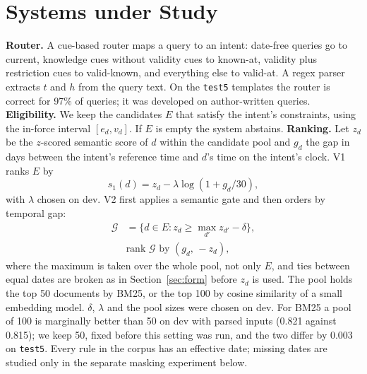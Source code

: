 \documentclass[11pt]{article}
\begin{document}
\section{Systems under Study}\label{sec:method}

\textbf{Router.} A cue-based router maps a query to an intent: date-free queries go to current, knowledge cues without validity cues to known-at, validity plus restriction cues to valid-known, and everything else to valid-at. A regex parser extracts $t$ and $h$ from the query text. On the \texttt{test5} templates the router is correct for 97\% of queries; it was developed on author-written queries. \textbf{Eligibility.} We keep the candidates $E$ that satisfy the intent's constraints, using the in-force interval $[e_d, v_d]$. If $E$ is empty the system abstains. \textbf{Ranking.} Let $z_d$ be the $z$-scored semantic score of $d$ within the candidate pool and $g_d$ the gap in days between the intent's reference time and $d$'s time on the intent's clock. V1 ranks $E$ by
\begin{equation}\label{eq:v1}
s_1(d) = z_d - \lambda \log\!\left(1 + g_d/30\right),
\end{equation}
with $\lambda$ chosen on dev. V2 first applies a semantic gate and then orders by temporal gap:
\begin{equation}\label{eq:v2}
\begin{split}
\mathcal{G} &= \{d \in E : z_d \ge \max_{d'} z_{d'} - \delta\},\\
&\text{rank } \mathcal{G} \text{ by } (g_d,\,-z_d),
\end{split}
\end{equation}
where the maximum is taken over the whole pool, not only $E$, and ties between equal dates are broken as in Section~\ref{sec:form} before $z_d$ is used. The pool holds the top 50 documents by BM25, or the top 100 by cosine similarity of a small embedding model. $\delta$, $\lambda$ and the pool sizes were chosen on dev. For BM25 a pool of 100 is marginally better than 50 on dev with parsed inputs (0.821 against 0.815); we keep 50, fixed before this setting was run, and the two differ by 0.003 on \texttt{test5}. Every rule in the corpus has an effective date; missing dates are studied only in the separate masking experiment below.
\end{document}
